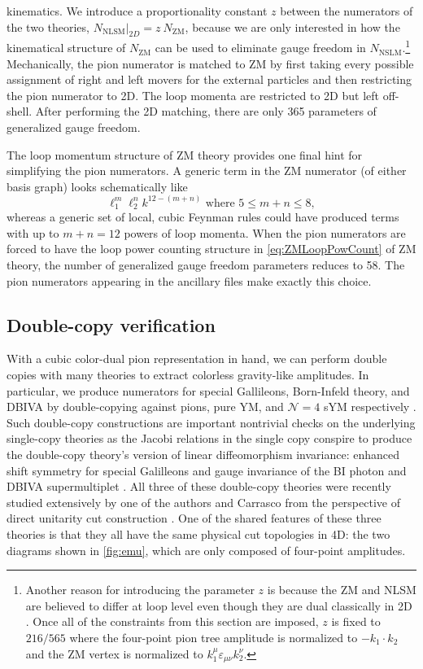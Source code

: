 \documentclass[11pt,letter]{article}
\begin{document}
kinematics.
We introduce a proportionality constant $z$ between the numerators of the two theories, $N_\text{NLSM} \vert_{2D} = z ~ N_\text{ZM}$, because we are only interested in how the kinematical structure of $N_\text{ZM}$ can be used to eliminate gauge freedom in $N_\text{NSLM}$.\footnote{Another reason for introducing the parameter $z$ is because the ZM and NLSM are believed to differ at loop level even though they are dual classically in 2D \cite{Nappi:1979ig}.  Once all of the constraints from this section are imposed, $z$ is fixed to $216/565$ where the four-point pion tree amplitude is normalized to $-k_1\cdot k_2$ and the ZM vertex is normalized to $k_1^\mu \varepsilon_{\mu\nu}k_2^\nu$.}
Mechanically, the pion numerator is matched
to ZM by first taking every possible assignment of right and left
movers for the external particles and then restricting the pion
numerator to 2D.  The loop momenta are restricted to 2D but left
off-shell.  After performing the 2D matching, there are only 365
parameters of generalized gauge freedom.

The loop momentum structure of ZM theory provides one final hint for
simplifying the pion numerators.  A generic term in the ZM numerator
(of either basis graph) looks schematically like
\begin{equation}
\label{eq:ZMLoopPowCount}
\ell_1^m \ell_2^n k^{12-(m+n)} \text{ where } 5 \leq m+n \leq 8,
\end{equation}
whereas a generic set of local, cubic Feynman rules could have
produced terms with up to $m+n=12$ powers of loop momenta.  When the
pion numerators are forced to have the loop power counting structure in
\cref{eq:ZMLoopPowCount} of ZM theory, the number of generalized gauge
freedom parameters reduces to 58.  The pion numerators appearing in the
ancillary files make exactly this choice.

\subsection{Double-copy verification}
\label{doubleCopyVerify}

With a cubic color-dual pion representation in hand, we can perform
double copies with many theories to extract colorless gravity-like
amplitudes.  In particular, we produce numerators for special
Gallileons, Born-Infeld theory, and DBIVA by double-copying against
pions, pure YM, and $\mathcal{N}=4$ sYM respectively
\cite{Cachazo:2014xea,Cheung:2015ota,Cheung:2016drk}.  Such double-copy constructions are important nontrivial
checks on the underlying single-copy theories as the Jacobi relations
in the single copy conspire to produce the double-copy theory's
version of linear diffeomorphism invariance: enhanced shift symmetry for special Galilleons and gauge
invariance of the BI photon and DBIVA supermultiplet \cite{Hinterbichler:2015pqa}.  All
three of these double-copy theories were recently studied extensively
by one of the authors and Carrasco from the perspective of direct
unitarity cut construction \cite{Carrasco:2023qgz}.  One of the shared
features of these three theories is that they all have the same
physical cut topologies in 4D: the two diagrams shown in
\cref{fig:emu}, which are only composed of four-point amplitudes.
\end{document}
